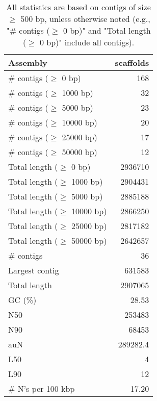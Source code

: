 \documentclass[12pt,a4paper]{article}
\begin{document}
\begin{table}[ht]
\begin{center}
\caption{All statistics are based on contigs of size $\geq$ 500 bp, unless otherwise noted (e.g., "\# contigs ($\geq$ 0 bp)" and "Total length ($\geq$ 0 bp)" include all contigs).}
\begin{tabular}{|l*{1}{|r}|}
\hline
Assembly & scaffolds \\ \hline
\# contigs ($\geq$ 0 bp) & 168 \\ \hline
\# contigs ($\geq$ 1000 bp) & 32 \\ \hline
\# contigs ($\geq$ 5000 bp) & 23 \\ \hline
\# contigs ($\geq$ 10000 bp) & 20 \\ \hline
\# contigs ($\geq$ 25000 bp) & 17 \\ \hline
\# contigs ($\geq$ 50000 bp) & 12 \\ \hline
Total length ($\geq$ 0 bp) & 2936710 \\ \hline
Total length ($\geq$ 1000 bp) & 2904431 \\ \hline
Total length ($\geq$ 5000 bp) & 2885188 \\ \hline
Total length ($\geq$ 10000 bp) & 2866250 \\ \hline
Total length ($\geq$ 25000 bp) & 2817182 \\ \hline
Total length ($\geq$ 50000 bp) & 2642657 \\ \hline
\# contigs & 36 \\ \hline
Largest contig & 631583 \\ \hline
Total length & 2907065 \\ \hline
GC (\%) & 28.53 \\ \hline
N50 & 253483 \\ \hline
N90 & 68453 \\ \hline
auN & 289282.4 \\ \hline
L50 & 4 \\ \hline
L90 & 12 \\ \hline
\# N's per 100 kbp & 17.20 \\ \hline
\end{tabular}
\end{center}
\end{table}
\end{document}
